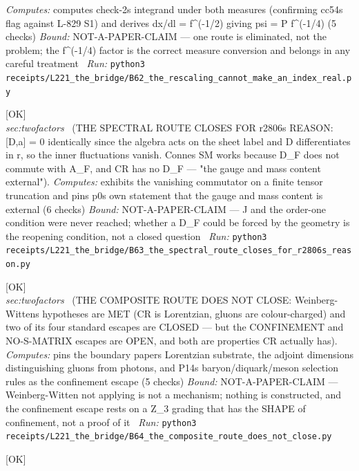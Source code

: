 \begin{description}
\emph{Computes:} computes check-2s integrand under both measures (confirming cc54s flag against L-829 S1) and derives dx/dl = f\textasciicircum{}(-1/2) giving psi = P f\textasciicircum{}(-1/4) (5 checks)
 \emph{Bound:} NOT-A-PAPER-CLAIM --- one route is eliminated, not the problem; the f\textasciicircum{}(-1/4) factor is the correct measure conversion and belongs in any careful treatment
\ \emph{Run:} \texttt{python3 receipts/L221\_the\_bridge/B62\_the\_rescaling\_cannot\_make\_an\_index\_real.py}
\item[\label{rcpt:B63_the_spectral_route_closes_for_r2806s_reason}\texttt{B63\_the\_spectral\_route\_closes\_for\_r2806s\_reason}]\hfill\textsf{[OK]}\\
\textit{sec:twofactors} \ (THE SPECTRAL ROUTE CLOSES FOR r2806s REASON: [D,a] = 0 identically since the algebra acts on the sheet label and D differentiates in r, so the inner fluctuations vanish. Connes SM works because D\_F does not commute with A\_F, and CR has no D\_F --- "the gauge and mass content external"). 
\emph{Computes:} exhibits the vanishing commutator on a finite tensor truncation and pins p0s own statement that the gauge and mass content is external (6 checks)
 \emph{Bound:} NOT-A-PAPER-CLAIM --- J and the order-one condition were never reached; whether a D\_F could be forced by the geometry is the reopening condition, not a closed question
\ \emph{Run:} \texttt{python3 receipts/L221\_the\_bridge/B63\_the\_spectral\_route\_closes\_for\_r2806s\_reason.py}
\item[\label{rcpt:B64_the_composite_route_does_not_close}\texttt{B64\_the\_composite\_route\_does\_not\_close}]\hfill\textsf{[OK]}\\
\textit{sec:twofactors} \ (THE COMPOSITE ROUTE DOES NOT CLOSE: Weinberg-Wittens hypotheses are MET (CR is Lorentzian, gluons are colour-charged) and two of its four standard escapes are CLOSED --- but the CONFINEMENT and NO-S-MATRIX escapes are OPEN, and both are properties CR actually has). 
\emph{Computes:} pins the boundary papers Lorentzian substrate, the adjoint dimensions distinguishing gluons from photons, and P14s baryon/diquark/meson selection rules as the confinement escape (5 checks)
 \emph{Bound:} NOT-A-PAPER-CLAIM --- Weinberg-Witten not applying is not a mechanism; nothing is constructed, and the confinement escape rests on a Z\_3 grading that has the SHAPE of confinement, not a proof of it
\ \emph{Run:} \texttt{python3 receipts/L221\_the\_bridge/B64\_the\_composite\_route\_does\_not\_close.py}
\item[\label{rcpt:B65_the_gluon_is_the_octet_and_p14_counts_the_singlet}\texttt{B65\_the\_gluon\_is\_the\_octet\_and\_p14\_counts\_the\_singlet}]\hfill\textsf{[OK]}\\

\end{description}

